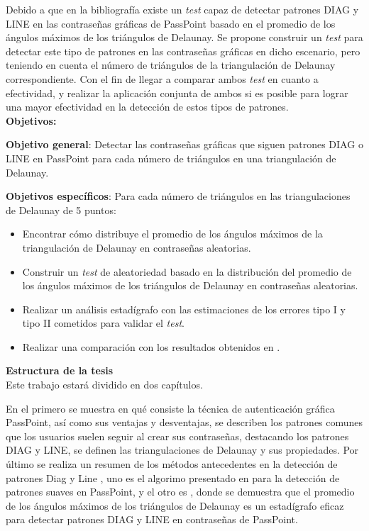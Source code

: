 \documentclass[12pt]{report}
\begin{document}
	\normalsize{
		Debido a que en la bibliografía existe un \textit{test} capaz de detectar patrones DIAG y LINE en las contraseñas gráficas de PassPoint basado en el promedio de los ángulos máximos de los triángulos de Delaunay. Se propone construir un \textit{test} para detectar este tipo de patrones en las contraseñas gráficas en dicho escenario, pero teniendo en cuenta el número de triángulos de la triangulación de Delaunay correspondiente. Con el fin de llegar a comparar ambos \textit{test} en cuanto a efectividad, y realizar la aplicación conjunta de ambos si es posible para lograr una mayor efectividad en la detección de estos tipos de patrones.
		}\\

	\large{\textbf{Objetivos:}}
	
	\normalsize{\textbf{Objetivo general}}: Detectar las contraseñas gráficas que siguen patrones DIAG o LINE en PassPoint para cada número de triángulos en una triangulación de Delaunay.
	
	\normalsize{\textbf{Objetivos específicos}}:
	Para cada número de triángulos  en las triangulaciones de Delaunay de 5 puntos:
	
	\begin{itemize}
		\item Encontrar cómo distribuye el promedio de los ángulos máximos de la triangulación de Delaunay en contraseñas aleatorias.
		\item Construir un \textit{test} de aleatoriedad basado en la distribución del promedio de los ángulos máximos de los triángulos de Delaunay en contraseñas aleatorias.
		
		\item Realizar un análisis estadígrafo con las estimaciones de los errores tipo I y tipo II cometidos para validar el \textit{test}.
		
		\item Realizar una comparación con los resultados obtenidos en \cite{13}.
		
	\end{itemize}
	
	
	{\large{\textbf{Estructura de la tesis}}}\\
	
	Este trabajo estará dividido en dos capítulos.
	
	En el primero se muestra en qué consiste la técnica de autenticación gráfica PassPoint, así como sus ventajas y desventajas, se describen los patrones comunes que los usuarios suelen seguir al crear sus contraseñas, destacando los patrones DIAG y LINE, se definen las triangulaciones de Delaunay y sus propiedades. Por último se realiza un resumen  de los métodos antecedentes en la detección de patrones Diag y Line , uno es el algorimo presentado en \cite{3} para la detección de patrones suaves en PassPoint, y el otro es \cite{13}, donde se demuestra que el promedio de los ángulos máximos de los  triángulos de Delaunay es un estadígrafo eficaz para detectar patrones DIAG y LINE en contraseñas de PassPoint.
	
\end{document}
